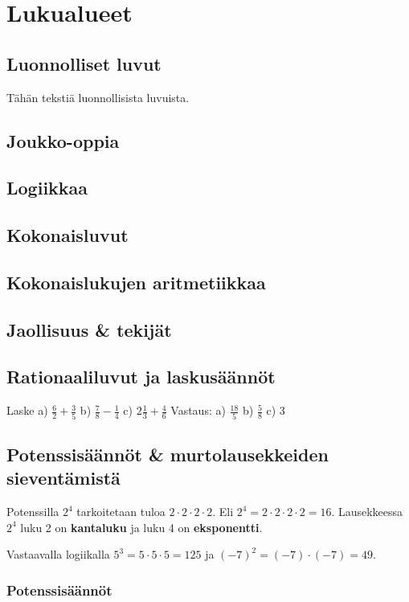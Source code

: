 


\part{Lukualueet}
\chapter{Luonnolliset luvut}

Tähän tekstiä luonnollisista luvuista.

\chapter{Joukko-oppia}
\chapter{Logiikkaa}
\chapter{Kokonaisluvut}
\chapter{Kokonaislukujen aritmetiikkaa}
\chapter{Jaollisuus \& tekijät}
\chapter{Rationaaliluvut ja laskusäännöt}

Laske %
a) $\frac{6}{2} + \frac{3}{5}$
b) $\frac{7}{8} - \frac{1}{4}$
c) $2 \frac{1}{3} + \frac{4}{6}$
Vastaus:
a) $\frac{18}{5}$
b) $\frac{5}{8}$
c) $3$

\chapter{Potenssisäännöt \& murtolausekkeiden sieventämistä}
Potenssilla $2^4$ tarkoitetaan tuloa $2\cdot 2\cdot 2\cdot 2$. Eli $2^4=2\cdot 2\cdot 2\cdot 2=16$. Lausekkeessa $2^4$ luku 2 on \textbf{kantaluku} ja luku 4 on \textbf{eksponentti}.

Vastaavalla logiikalla $5^3=5\cdot 5\cdot 5=125$ ja $(-7)^2=(-7)\cdot (-7)=49$.

\section{Potenssisäännöt}

